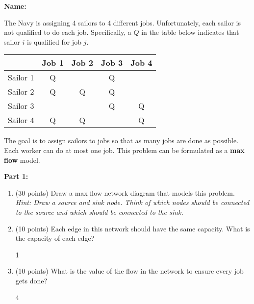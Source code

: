 \documentclass[letterpaper,oneside,12pt]{article}%
\newcommand{\blu}{\color{blue}}
\begin{document}
\noindent{}

\vspace{3mm} \hspace{\fill} \textbf{Name: \underline{\hspace{6cm}}}

The Navy is assigning 4 sailors to 4 different jobs. Unfortunately, each sailor is not qualified to do each job. Specifically, a $Q$ in the table below indicates that sailor $i$ is qualified for job $j$.

\begin{center}
\begin{tabular}{c|cccc} 
\hline 
           & Job 1 & Job 2 & Job 3 & Job 4  \\ \hline
Sailor 1   &  Q    &       & Q     &        \\ 
Sailor 2   & Q     & Q     & Q     &        \\ 
Sailor 3   &       &       & Q     & Q      \\
Sailor 4   & Q     & Q     &       & Q      \\  \hline 
\end{tabular}
\end{center}

The goal is to assign sailors to jobs so that as many jobs are done as possible. Each worker can do at most one job. This problem can be formulated as a \textbf{max flow} model.

\textbf{Part 1:}

\begin{enumerate}
\item (30 points) Draw a max flow network diagram that models this problem. \emph{Hint: Draw a source and sink node. Think of which nodes should be connected to the source and which should be connected to the sink.} \vfill

\item (10 points) Each edge in this network should have the same capacity. What is the capacity of each edge? 

{\blu 1
}

\item (10 points) What is the value of the flow in the network to ensure every job gets done? 

{\blu
4
}
\end{enumerate}
\newpage
\end{document}
